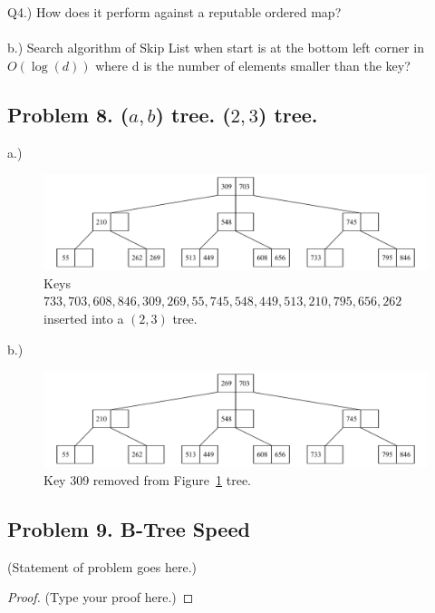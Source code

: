 \documentclass[12pt]{article}
\begin{document}
Q4.) How does it perform against a reputable ordered map?
\\\\
	
b.) Search algorithm of Skip List when start is at the bottom left corner in $O(\log(d))$ where d is the number of elements smaller than the key?
	

	
	\vspace{2in} %
	
	
	
	\subsection*{Problem 8. ($a,b$) tree. ($2, 3$) tree.}

	a.)	
	\begin{figure}[H] 
		\centering
		\includegraphics[width=0.9\linewidth]{Q8_a.drawio}
		\caption{Keys $733, 703, 608, 846, 309, 269, 55, 745, 548, 449, 513, 210, 795, 656, 262$ inserted into a $(2, 3)$ tree.}
		\label{fig:q8a}
	\end{figure}
	

	
	b.) 
	\begin{figure}[H] 
		\centering
		\includegraphics[width=0.9\linewidth]{Q8_b.drawio}
		\caption{Key 309 removed from Figure~\ref{fig:q8a} tree.}
		\label{fig:q8b}
	\end{figure}
	
	
	\vspace{2in} %
	
	
	\subsection*{Problem 9. B-Tree Speed}
	(Statement of problem goes here.)\\
	
	\begin{proof}
		(Type your proof here.)
	\end{proof}
	
	\vspace{2in} %
	
	
	
	
	
\end{document}
